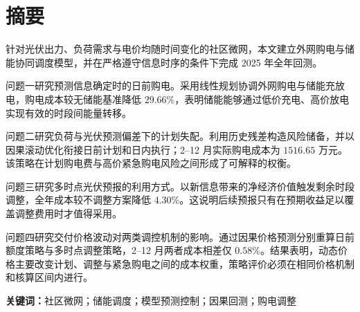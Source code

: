 \section*{摘要}
针对光伏出力、负荷需求与电价均随时间变化的社区微网，本文建立外网购电与储能协同调度模型，并在严格遵守信息时序的条件下完成 2025 年全年回测。

问题一研究预测信息确定时的日前购电。采用线性规划协调外网购电与储能充放电，购电成本较无储能基准降低 $29.66\%$，表明储能能够通过低价充电、高价放电实现有效的时段间能量转移。

问题二研究负荷与光伏预测偏差下的计划失配。利用历史残差构造风险储备，并以因果滚动优化衔接日前计划和日内执行；2--12 月实际购电成本为 $1516.65$ 万元。该策略在计划购电费与高价紧急购电风险之间形成了可解释的权衡。

问题三研究多时点光伏预报的利用方式。以新信息带来的净经济价值触发剩余时段调整，全年成本较不调整方案降低 $4.30\%$。这说明后续预报只有在预期收益足以覆盖调整费用时才值得采用。

问题四研究交付价格波动对两类调控机制的影响。通过因果价格预测分别重算日前额度策略与多时点调整策略，2--12 月两者成本相差仅 $0.58\%$。结果表明，动态价格主要改变计划、调整与紧急购电之间的成本权重，策略评价必须在相同价格机制和核算区间内进行。

\par\noindent\textbf{关键词：}社区微网；储能调度；模型预测控制；因果回测；购电调整
